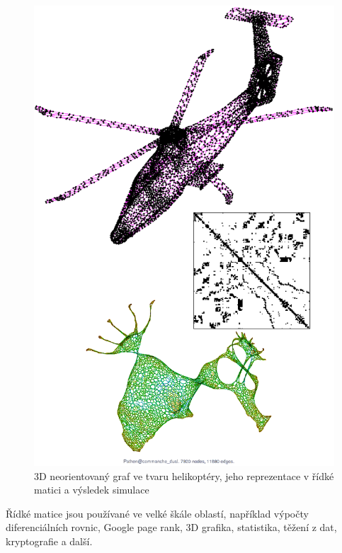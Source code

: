 \begin{figure}
	\includegraphics[width=1.0\textwidth]{./images/commanche/commanche}
	\caption{3D neorientovaný graf ve tvaru helikoptéry, jeho reprezentace v řídké matici a výsledek simulace}
	\label{fig:commanche}
\end{figure}

Řídké matice jsou používané ve velké škále oblastí\cite{sparsesw}, například výpočty diferenciálních rovnic, Google page rank, 3D grafika, statistika, těžení z dat, kryptografie a další.

